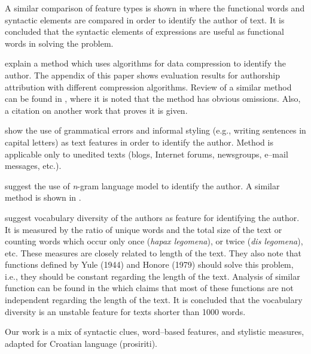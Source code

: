 \documentclass[11pt,english]{article}
\begin{document}
\begin{multicols}{2}
A similar comparison of feature types is shown in
\citep{uzuner2005comparative} where the functional words and syntactic
elements are compared in order to identify the author of text. It is
concluded that the syntactic elements of expressions are useful as functional words in solving the
problem.

\citet{kukushkina2001using} explain a method which uses algorithms for data
compression to identify the author. The appendix of this paper shows evaluation results
for authorship attribution with different compression algorithms.
Review of a similar method can be found in 
\citep{zhao2005effective}, where it is noted that the method has obvious omissions. Also, a citation on another work that proves it is given.

\citet{koppel2003exploiting} show the use of grammatical errors and informal
styling (e.g., writing sentences in capital letters) as text features in
order to identify the author. Method is applicable only to unedited texts (blogs,
Internet forums, newsgroups, e--mail messages, etc.).

\citet{peng2003language} suggest the use of \emph{n}-gram language model to identify
the author. A similar method is shown in \citep{coyotl2006authorship}.

\citet{stamatatos2001computer} suggest vocabulary diversity of the authors as
feature for identifying the author. It is measured by the ratio of unique words
and the total size of the text or counting words which occur only once
(\emph{hapax legomena}), or twice (\emph{dis legomena}), etc.
These measures are closely related to length of the text. They also note that
functions defined by Yule (1944) and Honore (1979) should solve this problem,
i.e., they should be constant regarding the length of the text. Analysis of
similar function can be found in the \citep{tweedie1998variable} which claims
that most of these functions are not independent regarding the length of the
text. It is concluded that the vocabulary diversity is an unstable feature for
texts shorter than 1000 words.

Our work is a mix of syntactic clues, word--based features, and stylistic measures, adapted for Croatian language (prosiriti).


\end{multicols}
\end{document}
